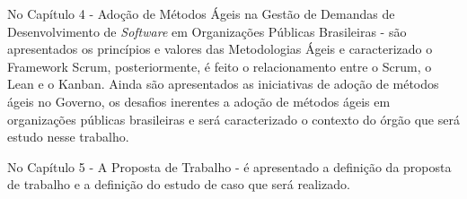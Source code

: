 No Capítulo 4  - Adoção de Métodos Ágeis na Gestão de Demandas de Desenvolvimento de \textit{Software} em Organizações Públicas Brasileiras - são apresentados os princípios e valores das Metodologias Ágeis e caracterizado o Framework Scrum, posteriormente, é feito o relacionamento entre o Scrum, o Lean e o Kanban. Ainda são apresentados as iniciativas de adoção de métodos ágeis no Governo, os desafios inerentes a adoção de métodos ágeis em organizações públicas brasileiras e será caracterizado o contexto do órgão que será estudo nesse trabalho.

No Capítulo 5 - A Proposta de Trabalho - é apresentado a definição da proposta de trabalho e a definição do estudo de caso que será realizado.
